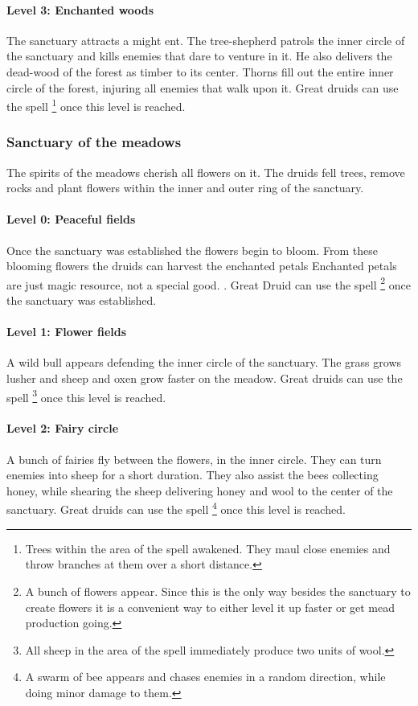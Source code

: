 \paragraph{Level 3: Enchanted woods}
The sanctuary attracts a might ent. The tree-shepherd patrols the inner circle
of the sanctuary and kills enemies that dare to venture in it. He also delivers
the dead-wood of the forest as timber to its center. Thorns fill out the entire
inner circle of the forest, injuring all enemies that walk upon it. Great
druids can use the spell \footnote{ Trees within
	the area of the spell awakened. They maul close enemies and throw branches at
	them over a short distance. } once this level is reached.

\subsubsection{Sanctuary of the meadows}
The spirits of the meadows cherish all flowers on it. The druids fell trees,
remove rocks and plant flowers within the inner and outer ring of the
sanctuary.

\paragraph{Level 0: Peaceful fields}
Once the sanctuary was established the flowers begin to bloom. From these
blooming flowers the druids can harvest the enchanted petals{ Enchanted petals
		are just magic resource, not a special good. }. Great Druid can use the spell
\footnote{ A bunch of flowers appear. Since this is the only
	way besides the sanctuary to create flowers it is a convenient way to either
	level it up faster or get mead production going. } once the sanctuary was
established.

\paragraph{Level 1: Flower fields}
A wild bull appears defending the inner circle of the sanctuary. The grass
grows lusher and sheep and oxen grow faster on the meadow. Great druids can use
the spell \footnote{ All sheep in the area of the
	spell immediately produce two units of wool. } once this level is reached.

\paragraph{Level 2: Fairy circle}
A bunch of fairies fly between the flowers, in the inner circle. They can turn
enemies into sheep for a short duration. They also assist the bees collecting
honey, while shearing the sheep delivering honey and wool to the center of the
sanctuary. Great druids can use the spell \footnote{ A
	swarm of bee appears and chases enemies in a random direction, while doing
	minor damage to them. } once this level is reached.

